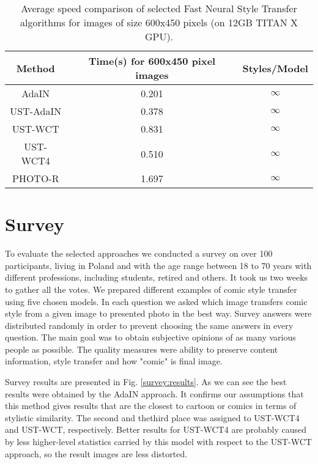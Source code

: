 \documentclass{llncs}
\begin{document}
\begin{table}[t]
\centering
\bgroup
\def\arraystretch{1.1}
\setlength\tabcolsep{2.6em}
\caption{Average speed comparison of selected Fast Neural Style Transfer algorithms for images of size 600x450 pixels (on 12GB TITAN X GPU).\label{speed:results}}
\begin{tabular}{| c | c | c |}
\hline
Method&Time(s) for 600x450 pixel images&Styles/Model\\
\hline
AdaIN&0.201&$\infty$\\
\hline

UST-AdaIN&0.378&$\infty$\\
\hline

UST-WCT&0.831&$\infty$\\
\hline

UST-WCT4&0.510&$\infty$\\
\hline

PHOTO-R&1.697&$\infty$\\
\hline

\end{tabular}

\egroup
\end{table}


\section{Survey}

To evaluate the selected approaches we conducted a survey on over 100 participants, living in Poland and with the age range between 18 to 70 years with different professions, including students, retired and others. %
It took us two weeks to gather all the votes. We prepared different examples of comic style transfer using five chosen models. In each question we asked which image transfers comic style from a given image to presented photo in the best way. Survey answers were distributed randomly in order to prevent choosing the same answers in every question. The main goal was to obtain subjective opinions of as many various people as possible. The quality measures were ability to preserve content information, style transfer and how "comic" is final image.


Survey results are presented in Fig. \ref{survey:results}. As we can see the best results were obtained by the AdaIN approach. It confirms our assumptions that this method gives results that are the closest to cartoon or comics in terms of stylistic similarity. The second and thethird place was assigned to UST-WCT4 and UST-WCT, respectively. Better results for UST-WCT4 are probably caused by less higher-level statistics carried by this model with respect to the UST-WCT approach, so the result images are less distorted.
\end{document}
